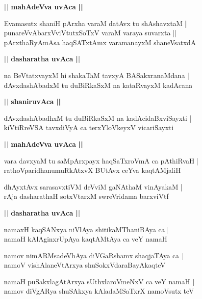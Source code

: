 \documentclass[twoside,12pt,openright]{book}
\newcounter{shloka}[chapter]
\def\uvaca#1{\centerline{{\large\textbf{#1}}}}
\begin{document}
\uvaca{|| mahAdeVva uvAca ||}

\begin{shloka}%
Evamasutx shaniH pArxha varaM datAvx tu shAshavxtaM |\\
punareVvAbarxVviVtutxSoTxV varaM varaya suvarxta ||\\
pArxthaRyAmAsa haqSATxtAmx varamanayxM shaneVsatxdA
\end{shloka}

\uvaca{|| dasharatha uvAca ||}

\begin{shloka}%
na BeVtatxvayxM hi shakaTaM tavxyA BASakxranaMdana |\\
dAvxdashAbadxM tu duBiRkaSxM na kataRvayxM kadAcana 
\end{shloka}

\uvaca{|| shaniruvAca ||}

\begin{shloka}%
dAvxdashAbadhxM tu duBiRkaSxM na kadAcidaBxviSayxti |\\
kiVtiRreVSA tavxdiVyA ca terxYloVkeyxV vicariSayxti
\end{shloka}

\uvaca{|| mahAdeVva uvAca ||}

\begin{shloka}%
vara davxyaM tu saMpArxpayx haqSaTxroVmA ca pAthiRvaH |\\
rathoVparidhanumuRkAtxvX BUtAvx ceYva kaqtAMjaliH
\end{shloka}

\begin{shloka}%
dhAyxtAvx sarasavxtiVM deVviM gaNAthaM vinAyakaM |\\
rAja dasharathaH sotxVtarxM swreVridama barxviVtf
\end{shloka}

\uvaca{|| dasharatha uvAca ||}

\begin{shloka}%
namaxH kaqSANxya niVlAya shitikaMThaniBAya ca |\\
namaH kAlAginxrUpAya kaqtAMtAya ca veY namaH 
\end{shloka}

\begin{shloka}%
namov nimARMsadeVhAya diVGaRshamx shaqjaTAya ca |\\
namoV vishAlaneVtArxya shuSokxVdaraBayAkaqteV 
\end{shloka}

\begin{shloka}%
namaH puSakxlagAtArxya sUthxlaroVmeNxV ca veY namaH |\\
namov diVgARya shuSAkxya kAladaMSaTxrX namoVsutx teV 
\end{shloka}
\end{document}
